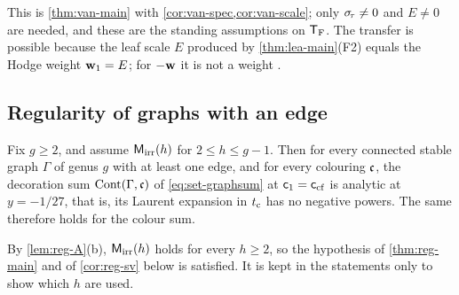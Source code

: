 This is \cref{thm:van-main} with \cref{cor:van-spec,cor:van-scale}; only $\sigma_{\!\tau}\neq 0$ and $E\neq 0$ are needed, and these are the standing assumptions on $\mathsf{T}_{\mathrm{F}}$. The transfer is possible because the leaf scale $E$ produced by \cref{thm:lea-main}\textup{(F2)} equals the Hodge weight $\mathbf{w}_1=E$; for $-\mathbf{w}$ it is not a weight .

\subsection{Regularity of graphs with an edge}

\begin{thm}
\label{thm:reg-main}
Fix $g\geq 2$, and assume $\mathsf{M}_{\mathrm{irr}}(h)$ for $2\leq h\leq g-1$. Then for every connected stable graph $\Gamma$ of genus $g$ with at least one edge, and for every colouring $\mathfrak{c}$, the decoration sum $\mathrm{Cont}(\Gamma,\mathfrak{c})$ of \eqref{eq:set-graphsum} at $\mathsf{c}_{1}=\mathsf{c}_{\mathrm{cf}}$ is analytic at $y=-1/27$, that is, its Laurent expansion in $t_{\mathrm{c}}$ has no negative powers. The same therefore holds for the colour sum.
\end{thm}

By \cref{lem:reg-A}\textup{(b)}, $\mathsf{M}_{\mathrm{irr}}(h)$ holds for every $h\geq 2$, so the hypothesis of \cref{thm:reg-main} and of \cref{cor:reg-sv} below is satisfied. It is kept in the statements only to show which $h$ are used.

